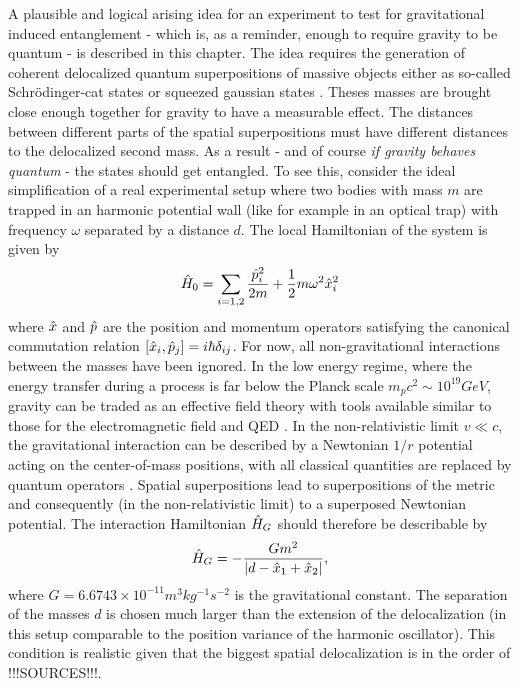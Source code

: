 A plausible and logical arising idea for an experiment to test for gravitational induced entanglement - which is, as a reminder, enough to require gravity to be quantum - is described in this chapter.
The idea requires the generation of coherent delocalized quantum superpositions of massive objects either as so-called Schrödinger-cat states or squeezed gaussian states \cite{Bose_2017, Pedernales_2023}. Theses masses are brought close enough together for gravity to have a measurable effect. The distances between different parts of the spatial superpositions must have different distances to the delocalized second mass. As a result - and of course \textit{if gravity behaves quantum} - the states should get entangled.
To see this, consider the ideal simplification of a real experimental setup where two bodies with mass $m$ are trapped in an harmonic potential wall (like for example in an optical trap) with frequency $\omega$ separated by a distance $d$. The local Hamiltonian of the system is given by
\begin{equation}
  \hat{H}_0 = \sum_{i = 1,2} \frac{\hat{p}_i^2}{2m} + \frac{1}{2}m\omega^2\hat{x}^2_i
\end{equation}
where $\hat{x}$ and $\hat{p}$ are the position and momentum operators satisfying the canonical commutation relation $[\hat{x}_i, \hat{p}_j] = i\hbar \delta_{ij}$.
For now, all non-gravitational interactions between the masses have been ignored. 
In the low energy regime, where the energy transfer during a process is far below the Planck scale $m_p c^2 \sim 10^{19}\si{GeV}$, gravity can be traded as an effective field theory with tools available similar to those for the electromagnetic field and QED \cite{Carney_2018}. 
In the non-relativistic limit $v \ll c$, the gravitational interaction can be described by a Newtonian $1/r$ potential acting on the center-of-mass positions, with all classical quantities are replaced by quantum operators \cite{Carney_2018,Pedernales_2023,Christodoulou_2022}. 
Spatial superpositions lead to superpositions of the metric and consequently (in the non-relativistic limit) to a superposed Newtonian potential.
The interaction Hamiltonian $\hat{H}_G$ should therefore be describable by
\begin{equation}\label{eq:2:gravity-hamiltonian}
  \hat{H}_G = - \frac{Gm^2}{\left\lvert d - \hat{x}_1 + \hat{x}_2\right\rvert} ,
\end{equation}
where $G=6.6743 \times 10^{-11} \si{m^3 kg^{-1} s^{-2}}$ is the gravitational constant. The separation of the masses $d$ is chosen much larger than the extension of the delocalization (in this setup comparable to the position variance of the harmonic oscillator). This condition is realistic given that the biggest spatial delocalization is in the order of !!!SOURCES!!!.
